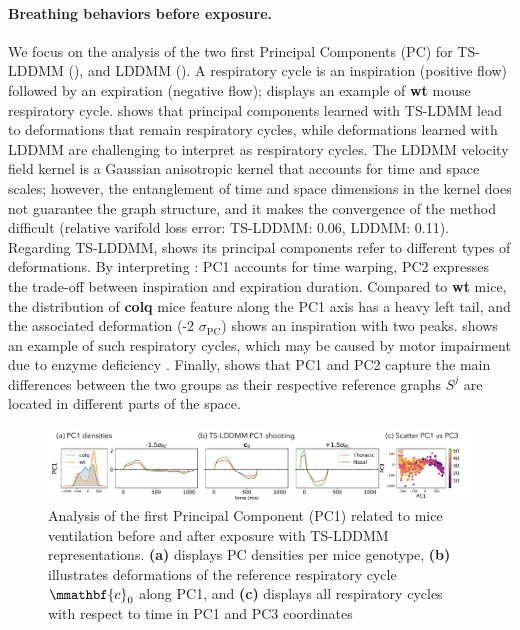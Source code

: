     
    \vspace{-1ex}
\paragraph{Breathing behaviors before exposure.}
 We focus on the analysis of the two first Principal Components (PC) for TS-LDDMM (), and LDDMM ().
  A respiratory cycle is an inspiration (positive flow) followed by an expiration (negative flow);  displays an example of \textbf{wt} mouse respiratory cycle.
    shows that principal components learned with TS-LDMM lead to deformations that remain respiratory cycles, while deformations learned with LDDMM are challenging to interpret as respiratory cycles.
   The LDDMM velocity field kernel is a Gaussian anisotropic kernel that accounts for time and space scales; however, the entanglement of time and space dimensions in the kernel does not guarantee the graph structure, and it makes the convergence of the method difficult (relative varifold loss error: TS-LDDMM: 0.06, LDDMM: 0.11).
    Regarding TS-LDDMM,  shows its principal components refer to different types of deformations.
     By interpreting : PC1 accounts for time warping, PC2 expresses the trade-off between inspiration and expiration duration.
      Compared to \textbf{wt} mice, the distribution of \textbf{colq} mice feature along the PC1 axis has a heavy left tail, and the associated deformation (-2 $\sigma_{\text{PC}}$) shows an inspiration with two peaks.
        shows an example of such respiratory cycles, which may be caused by motor impairment due to enzyme deficiency \cite{germain2023unsupervised}.
        Finally,  shows that PC1 and PC2 capture the main differences between the two groups as their respective reference graphs $S^j$ are located in different parts of the space. 

\begin{figure}[t]
  \centering
  \includegraphics[width=0.95\linewidth]{pictures/exp after/exp after.pdf}
  \caption{Analysis of the first Principal Component (PC1) related to mice ventilation before and after exposure with TS-LDDMM representations. \textbf{(a)} displays PC densities per mice genotype, \textbf{(b)} illustrates deformations of the reference respiratory cycle $\mmathbf{c}_0$ along PC1, and \textbf{(c)} displays all respiratory cycles with respect to time in PC1 and PC3 coordinates}
  \label{fig:exp_2_PCAold}
  \vspace{-1.5em}
\end{figure}
\vspace{-1ex}
